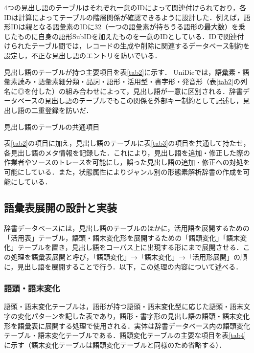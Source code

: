 \documentclass[japanese]{jnlp_1.4}
\begin{document}
4つの見出し語のテーブルはそれぞれ一意のIDによって関連付けられており，各IDは計算によってテーブルの階層関係が確認できるように設計した．例えば，語形IDは親となる語彙素のIDに32（一つの語彙素が持ちうる語形の最大数）を乗じたものに自身の語形SubIDを加えたものを一意のIDとしている．IDで関連付けられたテーブル間では，レコードの生成や削除に関連するデータベース制約を設定し，不正な見出し語のエントリを防いでいる．

見出し語のテーブルが持つ主要項目を表\ref{tab2}に示す．
UniDicでは，語彙素・語彙素読み・語彙素細分類・品詞・語形・活用型・書字形・発音形（表\ref{tab2}の列名に◎を付した）の組み合わせによって，見出し語が一意に区別される．辞書データベースの見出し語のテーブルでもこの関係を外部キー制約として記述し，見出し語の二重登録を防いだ．

\begin{table}[t]
\caption{見出し語のテーブルの共通項目}
\label{tab3}

\end{table}

表\ref{tab2}の項目に加え，見出し語のテーブルに表\ref{tab3}の項目を共通して持たせ，各見出し語のメタ情報を記録した．これにより，見出し語を追加・修正した際の作業者やソースのトレースを可能にし，誤った見出し語の追加・修正への対処を可能にしている．また，状態属性によりジャンル別の形態素解析辞書の作成を可能にしている．


\subsection{語彙表展開の設計と実装}

辞書データベースには，見出し語のテーブルのほかに，活用語を展開するための「活用表」テーブル，語頭・語末変化形を展開するための「語頭変化」「語末変化」テーブルを置き，見出し語をコーパス上に出現する形にまで展開させる．この処理を語彙表展開と呼び，「語頭変化」→「語末変化」→「活用形展開」の順に，見出し語を展開することで行う．以下，この処理の内容について述べる．

\subsubsection*{語頭・語末変化}

語頭・語末変化テーブルは，語形が持つ語頭・語末変化型に応じた語頭・語末文字の変化パターンを記した表であり，語形・書字形の見出し語の語頭・語末変化形を語彙表に展開する処理で使用される．実体は辞書データベース内の語頭変化テーブル・語末変化テーブルである．語頭変化テーブルの主要な項目を表\ref{tab4}に示す（語末変化テーブルは語頭変化テーブルと同様のため省略する）．
\end{document}
